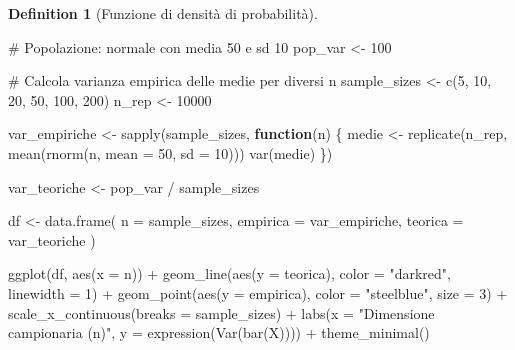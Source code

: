 \documentclass[
  letterpaper,
  DIV=11,
  numbers=noendperiod,
  oneside]{scrreprt}
\newenvironment{Shaded}{\begin{snugshade}}{\end{snugshade}}
\newcommand{\AttributeTok}[1]{\textcolor[rgb]{0.40,0.45,0.13}{#1}}
\newcommand{\CommentTok}[1]{\textcolor[rgb]{0.37,0.37,0.37}{#1}}
\newcommand{\ControlFlowTok}[1]{\textcolor[rgb]{0.00,0.23,0.31}{\textbf{#1}}}
\newcommand{\DecValTok}[1]{\textcolor[rgb]{0.68,0.00,0.00}{#1}}
\newcommand{\FunctionTok}[1]{\textcolor[rgb]{0.28,0.35,0.67}{#1}}
\newcommand{\NormalTok}[1]{\textcolor[rgb]{0.00,0.23,0.31}{#1}}
\newcommand{\OtherTok}[1]{\textcolor[rgb]{0.00,0.23,0.31}{#1}}
\newcommand{\SpecialCharTok}[1]{\textcolor[rgb]{0.37,0.37,0.37}{#1}}
\newcommand{\StringTok}[1]{\textcolor[rgb]{0.13,0.47,0.30}{#1}}
\theoremstyle{definition}
\theoremstyle{plain}
\theoremstyle{definition}
\newtheorem{definition}{Definition}[chapter]
\theoremstyle{remark}
\begin{document}
\begin{definition}[Funzione di densità di
probabilità]
\begin{Shaded}
\begin{Highlighting}[]
\CommentTok{\# Popolazione: normale con media 50 e sd 10}
\NormalTok{pop\_var }\OtherTok{\textless{}{-}} \DecValTok{100}

\CommentTok{\# Calcola varianza empirica delle medie per diversi n}
\NormalTok{sample\_sizes }\OtherTok{\textless{}{-}} \FunctionTok{c}\NormalTok{(}\DecValTok{5}\NormalTok{, }\DecValTok{10}\NormalTok{, }\DecValTok{20}\NormalTok{, }\DecValTok{50}\NormalTok{, }\DecValTok{100}\NormalTok{, }\DecValTok{200}\NormalTok{)}
\NormalTok{n\_rep }\OtherTok{\textless{}{-}} \DecValTok{10000}

\NormalTok{var\_empiriche }\OtherTok{\textless{}{-}} \FunctionTok{sapply}\NormalTok{(sample\_sizes, }\ControlFlowTok{function}\NormalTok{(n) \{}
\NormalTok{  medie }\OtherTok{\textless{}{-}} \FunctionTok{replicate}\NormalTok{(n\_rep, }\FunctionTok{mean}\NormalTok{(}\FunctionTok{rnorm}\NormalTok{(n, }\AttributeTok{mean =} \DecValTok{50}\NormalTok{, }\AttributeTok{sd =} \DecValTok{10}\NormalTok{)))}
  \FunctionTok{var}\NormalTok{(medie)}
\NormalTok{\})}

\NormalTok{var\_teoriche }\OtherTok{\textless{}{-}}\NormalTok{ pop\_var }\SpecialCharTok{/}\NormalTok{ sample\_sizes}

\NormalTok{df }\OtherTok{\textless{}{-}} \FunctionTok{data.frame}\NormalTok{(}
  \AttributeTok{n =}\NormalTok{ sample\_sizes,}
  \AttributeTok{empirica =}\NormalTok{ var\_empiriche,}
  \AttributeTok{teorica =}\NormalTok{ var\_teoriche}
\NormalTok{)}

\FunctionTok{ggplot}\NormalTok{(df, }\FunctionTok{aes}\NormalTok{(}\AttributeTok{x =}\NormalTok{ n)) }\SpecialCharTok{+}
  \FunctionTok{geom\_line}\NormalTok{(}\FunctionTok{aes}\NormalTok{(}\AttributeTok{y =}\NormalTok{ teorica), }\AttributeTok{color =} \StringTok{"darkred"}\NormalTok{, }\AttributeTok{linewidth =} \DecValTok{1}\NormalTok{) }\SpecialCharTok{+}
  \FunctionTok{geom\_point}\NormalTok{(}\FunctionTok{aes}\NormalTok{(}\AttributeTok{y =}\NormalTok{ empirica), }\AttributeTok{color =} \StringTok{"steelblue"}\NormalTok{, }\AttributeTok{size =} \DecValTok{3}\NormalTok{) }\SpecialCharTok{+}
  \FunctionTok{scale\_x\_continuous}\NormalTok{(}\AttributeTok{breaks =}\NormalTok{ sample\_sizes) }\SpecialCharTok{+}
  \FunctionTok{labs}\NormalTok{(}\AttributeTok{x =} \StringTok{"Dimensione campionaria (n)"}\NormalTok{, }
       \AttributeTok{y =} \FunctionTok{expression}\NormalTok{(}\FunctionTok{Var}\NormalTok{(}\FunctionTok{bar}\NormalTok{(X)))) }\SpecialCharTok{+}
  \FunctionTok{theme\_minimal}\NormalTok{()}
\end{Highlighting}
\end{Shaded}


\end{definition}
\end{document}
